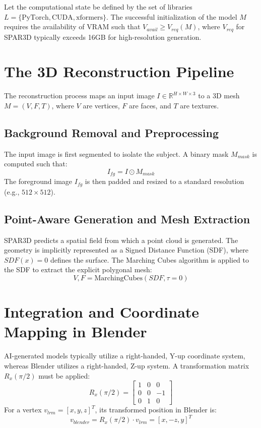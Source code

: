 \documentclass[10pt,journal,compsoc]{IEEEtran}
\begin{document}
Let the computational state be defined by the set of libraries $L = \{ \text{PyTorch}, \text{CUDA}, \text{xformers} \}$. The successful initialization of the model $M$ requires the availability of VRAM such that $V_{avail} \ge V_{req}(M)$, where $V_{req}$ for SPAR3D typically exceeds 16GB for high-resolution generation.

\section{The 3D Reconstruction Pipeline}
The reconstruction process maps an input image $I \in \mathbb{R}^{H \times W \times 3}$ to a 3D mesh $M = (V, F, T)$, where $V$ are vertices, $F$ are faces, and $T$ are textures.

\subsection{Background Removal and Preprocessing}
The input image is first segmented to isolate the subject. A binary mask $M_{mask}$ is computed such that:
\[ I_{fg} = I \odot M_{mask} \]
The foreground image $I_{fg}$ is then padded and resized to a standard resolution (e.g., $512 \times 512$).

\subsection{Point-Aware Generation and Mesh Extraction}
SPAR3D predicts a spatial field from which a point cloud is generated. The geometry is implicitly represented as a Signed Distance Function (SDF), where $SDF(x) = 0$ defines the surface. The Marching Cubes algorithm is applied to the SDF to extract the explicit polygonal mesh:
\[ V, F = \text{MarchingCubes}(SDF, \tau=0) \]

\section{Integration and Coordinate Mapping in Blender}
AI-generated models typically utilize a right-handed, Y-up coordinate system, whereas Blender utilizes a right-handed, Z-up system. A transformation matrix $R_x(\pi/2)$ must be applied:
\[ R_x(\pi/2) = \begin{bmatrix} 1 & 0 & 0 \\ 0 & 0 & -1 \\ 0 & 1 & 0 \end{bmatrix} \]
For a vertex $v_{lrm} = [x, y, z]^T$, its transformed position in Blender is:
\[ v_{blender} = R_x(\pi/2) \cdot v_{lrm} = [x, -z, y]^T \]
\end{document}
